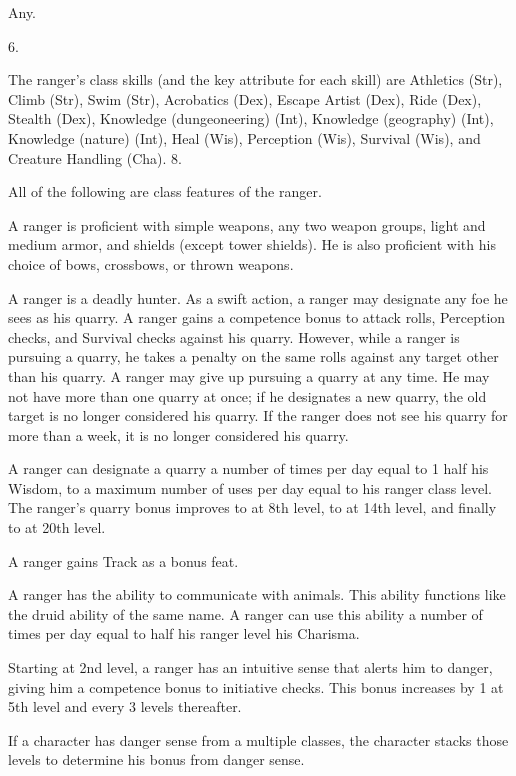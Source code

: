  Any.

 6.

The ranger's class skills (and the key attribute for each skill) are Athletics (Str), Climb (Str), Swim (Str), Acrobatics (Dex), Escape Artist (Dex), Ride (Dex), Stealth (Dex), Knowledge (dungeoneering) (Int), Knowledge (geography) (Int), Knowledge (nature) (Int), Heal (Wis), Perception (Wis), Survival (Wis), and Creature Handling (Cha).
 8.


All of the following are class features of the ranger.

  A ranger is proficient with simple weapons, any two weapon groups, light and medium armor, and shields (except tower shields). He is also proficient with his choice of bows, crossbows, or thrown weapons.

 A ranger is a deadly hunter. As a swift action, a ranger may designate any foe he sees as his quarry. A ranger gains a  competence bonus to attack rolls, Perception checks, and Survival checks against his quarry. However, while a ranger is pursuing a quarry, he takes a  penalty on the same rolls against any target other than his quarry. A ranger may give up pursuing a quarry at any time. He may not have more than one quarry at once; if he designates a new quarry, the old target is no longer considered his quarry. If the ranger does not see his quarry for more than a week, it is no longer considered his quarry.

\par A ranger can designate a quarry a number of times per day equal to 1 \add half his Wisdom, to a maximum number of uses per day equal to his ranger class level. The ranger's quarry bonus improves to  at 8th level, to  at 14th level, and finally to  at 20th level.

 A ranger gains Track as a bonus feat.

 A ranger has the ability to communicate with animals. This ability functions like the druid ability of the same name. A ranger can use this ability a number of times per day equal to half his ranger level \add his Charisma.

 Starting at 2nd level, a ranger has an intuitive sense that alerts him to danger, giving him a  competence bonus to initiative checks. This bonus increases by 1 at 5th level and every 3 levels thereafter.
\par If a character has danger sense from a multiple classes, the character stacks those levels to determine his bonus from danger sense.

